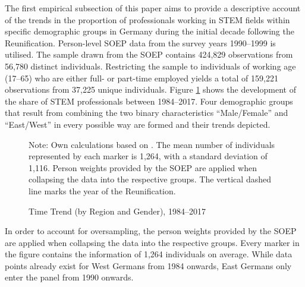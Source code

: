 \documentclass[a4paper, oneside, hyperfootnotes = false]{article}
\begin{document}
{The first empirical subsection of this paper aims to provide a descriptive account of the trends in the proportion of professionals working in STEM fields within specific demographic groups in Germany during the initial decade following the Reunification.
Person-level SOEP data from the survey years 1990--1999 is utilised.
The sample drawn from the SOEP contains 424,829 observations from 56,780 distinct individuals.
Restricting the sample to individuals of working age (17--65) who are either full- or part-time employed yields a total of 159,221 observations from 37,225 unique individuals.
Figure \ref{fig:timetrend} shows the development of the share of STEM professionals between 1984--2017.
Four demographic groups that result from combining the two binary characteristics ``Male/Female'' and ``East/West'' in every possible way are formed and their trends depicted.

\begin{figure}[ht]
	\centering
	\caption{Time Trend (by Region and Gender), 1984--2017}
	\label{fig:timetrend}
	\fontsize{9pt}{11pt}\selectfont
	\def\svgwidth{.9\textwidth}
	
	\vspace{2mm}
	\parbox{10cm}{
		\linespread{1}\footnotesize Note: Own calculations based on \cite{SOEP2023}. The mean number of individuals represented by each marker is 1,264, with a standard deviation of 1,116. Person weights provided by the SOEP are applied when collapsing the data into the respective groups. The vertical dashed line marks the year of the Reunification.}
\end{figure}

In order to account for oversampling, the person weights provided by the SOEP are applied when collapsing the data into the respective groups.
Every marker in the figure contains the information of 1,264 individuals on average.
While data points already exist for West Germans from 1984 onwards, East Germans only enter the panel from 1990 onwards.

}
\end{document}
